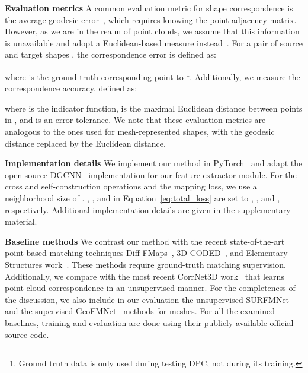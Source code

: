 \medskip

\noindent \textbf{Evaluation metrics} \quad A common evaluation metric for shape correspondence is the average geodesic error~\cite{litany2017deep, donati2020deep}, which requires knowing the point adjacency matrix. However, as we are in the realm of point clouds, we assume that this information is unavailable and adopt a Euclidean-based measure instead~\cite{zeng2020corrnet3d}. For a pair of source and target shapes , the correspondence error is defined as:


\noindent where  is the ground truth corresponding point to \footnote{Ground truth data is only used during testing DPC, not during its training.}. Additionally, we measure the correspondence accuracy, defined as:


\noindent where  is the indicator function,  is the maximal Euclidean distance between points in , and  is an error tolerance. We note that these evaluation metrics are analogous to the ones used for mesh-represented shapes, with the geodesic distance replaced by the Euclidean distance.

\medskip

\noindent \textbf{Implementation details} \quad We implement our method in PyTorch~\cite{paszke2017automatic} and adapt the open-source DGCNN~\cite{wang2019dynamic} implementation for our feature extractor module. For the cross and self-construction operations and the mapping loss, we use a neighborhood size of . , , and  in Equation~\ref{eq:total_loss} are set to , , and , respectively. Additional implementation details are given in the supplementary material. 

\medskip

\noindent \textbf{Baseline methods} \quad We contrast our method with the recent state-of-the-art point-based matching techniques Diff-FMaps~\cite{marin2020correspondence}, 3D-CODED~\cite{groueix20183dcoded}, and Elementary Structures work~\cite{deprelle2019learning}. These methods require ground-truth matching supervision. Additionally, we compare with the most recent CorrNet3D work~\cite{zeng2020corrnet3d} that learns point cloud correspondence in an unsupervised manner. For the completeness of the discussion, we also include in our evaluation the unsupervised SURFMNet~\cite{roufosse2019unsupervised} and the supervised GeoFMNet~\cite{donati2020deep} methods for meshes. For all the examined baselines, training and evaluation are done using their publicly available official source code.














